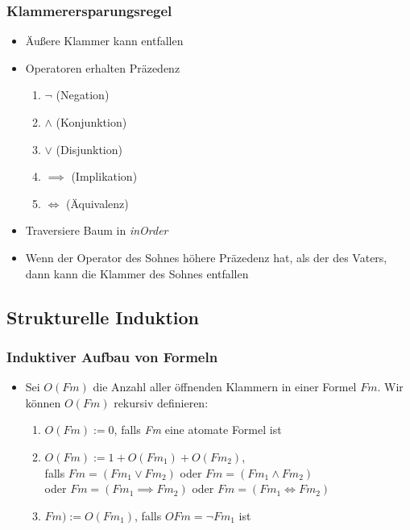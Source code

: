 \documentclass{scrartcl}
\begin{document}
\pagebreak
\subsubsection{Klammerersparungsregel}

\begin{itemize}
	\item Äußere Klammer kann entfallen
	\item Operatoren erhalten Präzedenz
	\begin{enumerate}
		\item $\neg$ (Negation)
		\item $\wedge$ (Konjunktion)
		\item $\vee$ (Disjunktion)
		\item $\implies$ (Implikation)
		\item $\iff$ (Äquivalenz)
	\end{enumerate}
	\item Traversiere Baum in \textit{inOrder}
	\item Wenn der Operator des Sohnes höhere Präzedenz hat, als der des Vaters, dann kann die Klammer des Sohnes entfallen
\end{itemize}

\subsection{Strukturelle Induktion}

\subsubsection{Induktiver Aufbau von Formeln}

\begin{itemize}
	\item Sei $O(Fm)$ die Anzahl aller öffnenden Klammern in einer Formel $Fm$. Wir können $O(Fm)$ rekursiv definieren:
	\begin{enumerate}
		\item $O(Fm) := 0$, falls \textit{Fm} eine atomate Formel ist
		\item $O(Fm) := 1 + O(Fm_1) + O(Fm_2)$, \\
		falls $Fm = (Fm_1 \vee Fm_2)$ oder $Fm = (Fm_1 \wedge Fm_2)$ \\
		oder $Fm = (Fm_1 \implies Fm_2)$ oder $Fm = (Fm_1 \iff Fm_2)$
		\item $Fm) := O(Fm_1)$, falls $OFm = \neg Fm_1$ ist
	\end{enumerate}
\end{itemize}
\end{document}

